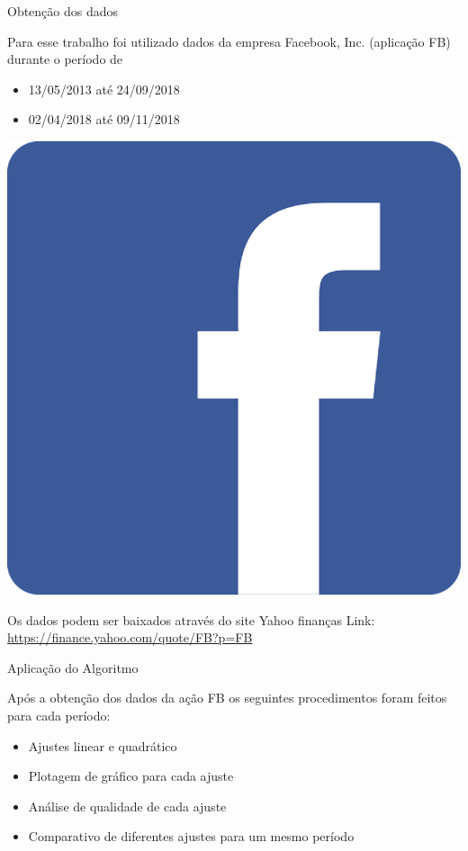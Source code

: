 \documentclass[10pt]{beamer}
\begin{document}
\begin{frame}{Obtenção dos dados}

  Para esse trabalho foi utilizado dados da empresa Facebook, Inc. (aplicação FB) durante o período de 
  \begin{itemize}
    \item 13/05/2013 até 24/09/2018
    \item 02/04/2018 até 09/11/2018
  \end{itemize}
  
  \begin{center}
    \includegraphics[scale=0.10]{images/facebook.png}
  \end{center}
  Os dados podem ser baixados através do site Yahoo finanças \newline
  Link: \url{https://finance.yahoo.com/quote/FB?p=FB}
\end{frame}

\begin{frame}{Aplicação do Algoritmo}

  Após a obtenção dos dados da ação FB os seguintes procedimentos foram feitos para cada período:
  \begin{itemize}
      \item Ajustes linear e quadrático 
      \item Plotagem de gráfico para cada ajuste 
      \item Análise de qualidade de cada ajuste 
      \item Comparativo de diferentes ajustes para um mesmo período 
  \end{itemize}
\end{frame}
\end{document}
